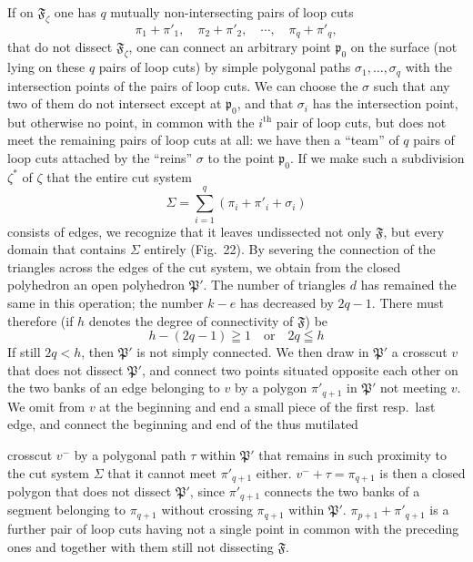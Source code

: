 \documentclass{article}
\begin{document}
If on $\mathfrak{F}_\zeta$ one has $q$ mutually non-intersecting pairs of loop cuts
\[ \pi_1 + \pi'_1, \quad \pi_2 + \pi'_2, \quad \cdots, \quad \pi_q + \pi'_q, \]
that do not dissect $\mathfrak{F}_\zeta$, one can connect an arbitrary point $\mathfrak{p}_0$ on the surface (not lying on these $q$ pairs of loop cuts) by simple polygonal paths $\sigma_1, \dots, \sigma_q$ with the intersection points of the pairs of loop cuts. We can choose the $\sigma$ such that any two of them do not intersect except at $\mathfrak{p}_0$, and that $\sigma_i$ has the intersection point, but otherwise no point, in common with the $i^{\text{th}}$ pair of loop cuts, but does not meet the remaining pairs of loop cuts at all: we have then a ``team'' of $q$ pairs of loop cuts attached by the ``reins'' $\sigma$ to the point $\mathfrak{p}_0$. If we make such a subdivision $\zeta^*$ of $\zeta$ that the entire cut system
\[ \Sigma = \sum_{i=1}^q (\pi_i + \pi'_i + \sigma_i) \]
consists of edges, we recognize that it leaves undissected not only $\mathfrak{F}$, but every domain that contains $\Sigma$ entirely (Fig.~22). By severing the connection of the triangles across the edges of the cut system, we obtain from the closed polyhedron an open polyhedron $\mathfrak{P}'$. The number of triangles $d$ has remained the same in this operation; the number $k - e$ has decreased by $2q - 1$. There must therefore (if $h$ denotes the degree of connectivity of $\mathfrak{F}$) be
\[ h - (2q - 1) \geqq 1 \quad \text{or} \quad 2q \leqq h \]
If still $2q < h$, then $\mathfrak{P}'$ is not simply connected. We then draw in $\mathfrak{P}'$ a crosscut $v$ that does not dissect $\mathfrak{P}'$, and connect two points situated opposite each other on the two banks of an edge belonging to $v$ by a polygon $\pi'_{q+1}$ in $\mathfrak{P}'$ not meeting $v$. We omit from $v$ at the beginning and end a small piece of the first resp.\ last edge, and connect the beginning and end of the thus mutilated

crosscut $v^-$ by a polygonal path $\tau$ within $\mathfrak{P}'$ that remains in such proximity to the cut system $\Sigma$ that it cannot meet $\pi'_{q+1}$ either. $v^- + \tau = \pi_{q+1}$ is then a closed polygon that does not dissect $\mathfrak{P}'$, since $\pi'_{q+1}$ connects the two banks of a segment belonging to $\pi_{q+1}$ without crossing $\pi_{q+1}$ within $\mathfrak{P}'$. $\pi_{p+1} + \pi'_{q+1}$ is a further pair of loop cuts having not a single point in common with the preceding ones and together with them still not dissecting $\mathfrak{F}$.
\end{document}
